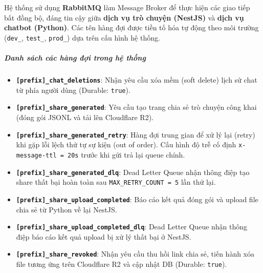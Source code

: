 Hệ thống sử dụng \textbf{RabbitMQ} làm Message Broker để thực hiện các giao tiếp bất đồng bộ, đáng tin cậy giữa \textbf{dịch vụ trò chuyện (NestJS)} và \textbf{dịch vụ chatbot (Python)}. Các tên hàng đợi được tiền tố hóa tự động theo môi trường (\texttt{dev\_}, \texttt{test\_}, \texttt{prod\_}) dựa trên cấu hình hệ thống.

\subparagraph{Danh sách các hàng đợi trong hệ thống}

\begin{itemize}
\item \textbf{\texttt{[prefix]\_chat\_deletions}}: Nhận yêu cầu xóa mềm (soft delete) lịch sử chat từ phía người dùng (Durable: \texttt{true}).

\item \textbf{\texttt{[prefix]\_share\_generated}}: Yêu cầu tạo trang chia sẻ trò chuyện công khai (đóng gói JSONL và tải lên Cloudflare R2).

\item \textbf{\texttt{[prefix]\_share\_generated\_retry}}: Hàng đợi trung gian để xử lý lại (retry) khi gặp lỗi lệch thứ tự sự kiện (out of order). Cấu hình độ trễ cố định \texttt{x-message-ttl = 20s} trước khi gửi trả lại queue chính.

\item \textbf{\texttt{[prefix]\_share\_generated\_dlq}}: Dead Letter Queue nhận thông điệp tạo share thất bại hoàn toàn sau \texttt{MAX\_RETRY\_COUNT = 5} lần thử lại.

\item \textbf{\texttt{[prefix]\_share\_upload\_completed}}: Báo cáo kết quả đóng gói và upload file chia sẻ từ Python về lại NestJS.

\item \textbf{\texttt{[prefix]\_share\_upload\_completed\_dlq}}: Dead Letter Queue nhận thông điệp báo cáo kết quả upload bị xử lý thất bại ở NestJS.

\item \textbf{\texttt{[prefix]\_share\_revoked}}: Nhận yêu cầu thu hồi link chia sẻ, tiến hành xóa file tương ứng trên Cloudflare R2 và cập nhật DB (Durable: \texttt{true}).
\end{itemize}



